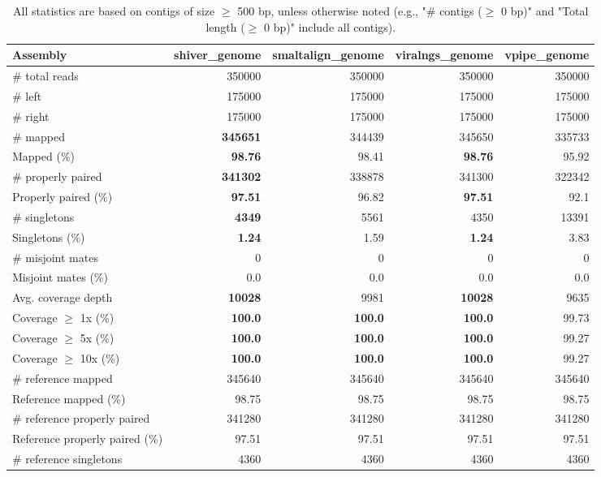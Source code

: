 \documentclass[12pt,a4paper]{article}
\begin{document}
\begin{table}[ht]
\begin{center}
\caption{All statistics are based on contigs of size $\geq$ 500 bp, unless otherwise noted (e.g., "\# contigs ($\geq$ 0 bp)" and "Total length ($\geq$ 0 bp)" include all contigs).}
\begin{tabular}{|l*{4}{|r}|}
\hline
Assembly & shiver\_genome & smaltalign\_genome & viralngs\_genome & vpipe\_genome \\ \hline
\# total reads & 350000 & 350000 & 350000 & 350000 \\ \hline
\# left & 175000 & 175000 & 175000 & 175000 \\ \hline
\# right & 175000 & 175000 & 175000 & 175000 \\ \hline
\# mapped & {\bf 345651} & 344439 & 345650 & 335733 \\ \hline
Mapped (\%) & {\bf 98.76} & 98.41 & {\bf 98.76} & 95.92 \\ \hline
\# properly paired & {\bf 341302} & 338878 & 341300 & 322342 \\ \hline
Properly paired (\%) & {\bf 97.51} & 96.82 & {\bf 97.51} & 92.1 \\ \hline
\# singletons & {\bf 4349} & 5561 & 4350 & 13391 \\ \hline
Singletons (\%) & {\bf 1.24} & 1.59 & {\bf 1.24} & 3.83 \\ \hline
\# misjoint mates & 0 & 0 & 0 & 0 \\ \hline
Misjoint mates (\%) & 0.0 & 0.0 & 0.0 & 0.0 \\ \hline
Avg. coverage depth & {\bf 10028} & 9981 & {\bf 10028} & 9635 \\ \hline
Coverage $\geq$ 1x (\%) & {\bf 100.0} & {\bf 100.0} & {\bf 100.0} & 99.73 \\ \hline
Coverage $\geq$ 5x (\%) & {\bf 100.0} & {\bf 100.0} & {\bf 100.0} & 99.27 \\ \hline
Coverage $\geq$ 10x (\%) & {\bf 100.0} & {\bf 100.0} & {\bf 100.0} & 99.27 \\ \hline
\# reference mapped & 345640 & 345640 & 345640 & 345640 \\ \hline
Reference mapped (\%) & 98.75 & 98.75 & 98.75 & 98.75 \\ \hline
\# reference properly paired & 341280 & 341280 & 341280 & 341280 \\ \hline
Reference properly paired (\%) & 97.51 & 97.51 & 97.51 & 97.51 \\ \hline
\# reference singletons & 4360 & 4360 & 4360 & 4360 \\ \hline

\end{tabular}
\end{center}
\end{table}
\end{document}
